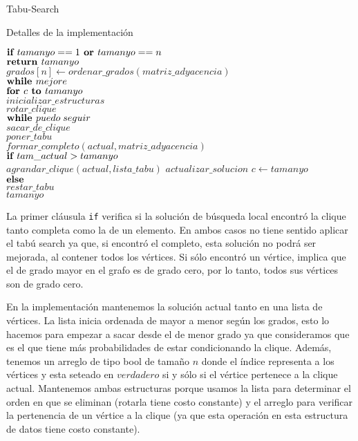 \begin{section}{Tabu-Search}
\begin{subsection}{Detalles de la implementación}
		\begin{pseudo}
			\tab $\textbf{if } tamanyo==1 \textbf{ or } tamanyo==n$\\
			\tab \tab $\textbf{return } tamanyo$\\
			\tab $grados[n] \leftarrow ordenar\_grados(matriz\_adyacencia)$\\
			\tab $\textbf{while } mejore$\\
			\tab \tab $\textbf{for } c \textbf{ to } tamanyo$\\
			\tab \tab \tab $inicializar\_estructuras$\\
			\tab \tab \tab $rotar\_clique$\\
			\tab \tab \tab $\textbf{while } puedo\;seguir$\\
			\tab \tab \tab \tab $sacar\_de\_clique$\\
			\tab \tab \tab \tab $poner\_tabu$\\
			\tab \tab \tab \tab $formar\_completo(actual,matriz\_adyacencia)$\\
			\tab \tab \tab \tab $\textbf{if } tam\_actual>tamanyo$\\
			\tab \tab \tab \tab \tab $agrandar\_clique(actual,lista\_tabu)$
			\tab \tab \tab \tab \tab $actualizar\_solucion$
			\tab \tab \tab \tab \tab $c \leftarrow tamanyo$\\
			\tab \tab \tab \tab $\textbf{else }$\\
			\tab \tab \tab \tab \tab $restar\_tabu$\\
			\tab \RET $tamanyo$\\
		\end{pseudo}

		La primer cláusula \texttt{if} verifica si la solución de búsqueda local encontró la clique tanto completa como la de un elemento. En ambos casos no tiene sentido aplicar el tabú search ya que, si encontró el completo, esta solución no podrá ser mejorada, al contener todos los vértices. Si sólo encontró un vértice, implica que el de grado mayor en el grafo es de grado cero, por lo tanto, todos sus vértices son de grado cero. 

		En la implementación mantenemos la solución actual tanto en una lista de vértices. La lista inicia ordenada de mayor a menor según los grados, esto lo hacemos para empezar a sacar desde el de menor grado ya que consideramos que es el que tiene más probabilidades de estar condicionando la clique. Además, tenemos un arreglo de tipo bool de tamaño $n$ donde el índice representa a los vértices y esta seteado en $verdadero$ si y sólo si el vértice pertenece a la clique actual. Mantenemos ambas estructuras porque usamos la lista para determinar el orden en que se eliminan (rotarla tiene costo constante) y el arreglo para verificar la pertenencia de un vértice a la clique (ya que esta operación en esta estructura de datos tiene costo constante).


\end{subsection}
\end{section}
